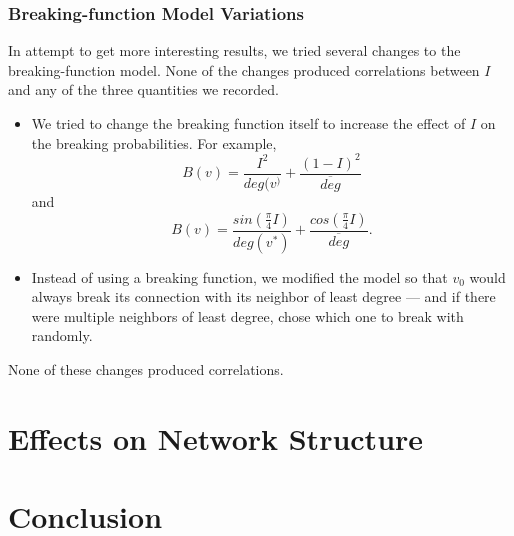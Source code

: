 \documentclass[a4paper,10pt]{article}
\begin{document}
\subsubsection{Breaking-function Model Variations}
In attempt to get more interesting results, we tried several changes to the breaking-function model. None of the changes produced correlations between $I$ and any of the three quantities we recorded.

\begin{itemize}

 \item We tried to change the breaking function itself to increase the effect of $I$ on the breaking probabilities. For example,
 \begin{equation}
  B(v) = \frac{I^2}{deg(v^)} + \frac{(1 - I)^2}{\overline{deg}}
 \end{equation}
and
 \begin{equation}
  B(v) = \frac{sin(\frac{\pi}{4}I)}{deg(v^*)} + \frac{cos(\frac{\pi}{4}I)}{\overline{deg}}.
 \end{equation}

 \item Instead of using a breaking function, we modified the model so that $v_0$ would always break its connection with its neighbor of least degree --- and if there were multiple neighbors of least degree, chose which one to break with randomly. 

\end{itemize}
 None of these changes produced correlations.

\section{Effects on Network Structure}

\section{Conclusion}
\end{document}
